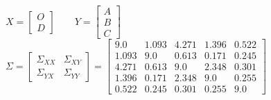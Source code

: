 \documentclass[11pt]{article}
\begin{document}
\pagebreak
    $
X=\left[\begin{matrix} O \\ D \end{matrix}\right] \qquad Y=\left[\begin{matrix} A \\ B \\ C \end{matrix}\right] \qquad $
$ \Sigma =
\left[\begin{matrix} \Sigma_{XX} & \Sigma_{XY} \\ \Sigma_{YX} & \Sigma_{YY} \end{matrix}\right] =
\left[\begin{matrix}9.0 & 1.093 & 4.271 & 1.396 & 0.522\\1.093 & 9.0 & 0.613 & 0.171 & 0.245\\4.271 & 0.613 & 9.0 & 2.348 & 0.301\\1.396 & 0.171 & 2.348 & 9.0 & 0.255\\0.522 & 0.245 & 0.301 & 0.255 & 9.0\end{matrix}\right] $
\end{document}
